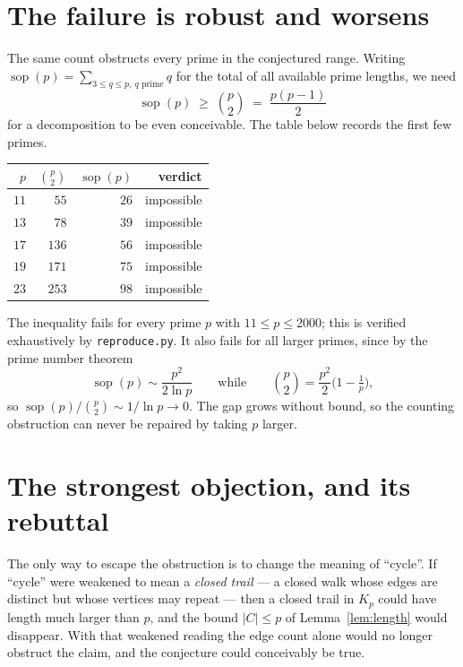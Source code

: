 \documentclass[11pt]{article}
\theoremstyle{definition}
\theoremstyle{remark}
\begin{document}
\section{The failure is robust and worsens}

The same count obstructs every prime in the conjectured range. Writing
$\operatorname{sop}(p) = \sum_{3 \le q \le p,\ q \text{ prime}} q$ for the total
of all available prime lengths, we need
\[
\operatorname{sop}(p) \;\ge\; \binom{p}{2} \;=\; \frac{p(p-1)}{2}
\]
for a decomposition to be even conceivable. The table below records the first
few primes.

\begin{center}
\begin{tabular}{r|r|r|r}
$p$ & $\binom{p}{2}$ & $\operatorname{sop}(p)$ & verdict \\ \hline
$11$ & $55$  & $26$  & impossible \\
$13$ & $78$  & $39$  & impossible \\
$17$ & $136$ & $56$  & impossible \\
$19$ & $171$ & $75$  & impossible \\
$23$ & $253$ & $98$  & impossible \\
\end{tabular}
\end{center}

The inequality fails for every prime $p$ with $11 \le p \le 2000$; this is
verified exhaustively by \texttt{reproduce.py}. It also fails for all larger
primes, since by the prime number theorem
\[
\operatorname{sop}(p) \sim \frac{p^2}{2 \ln p}
\qquad\text{while}\qquad
\binom{p}{2} = \frac{p^2}{2}\bigl(1 - \tfrac1p\bigr),
\]
so $\operatorname{sop}(p) / \binom{p}{2} \sim 1/\ln p \to 0$. The gap grows
without bound, so the counting obstruction can never be repaired by taking
$p$ larger.

\section{The strongest objection, and its rebuttal}

The only way to escape the obstruction is to change the meaning of ``cycle''.
If ``cycle'' were weakened to mean a \emph{closed trail} --- a closed walk whose
edges are distinct but whose vertices may repeat --- then a closed trail in
$K_p$ could have length much larger than $p$, and the bound
$\lvert C \rvert \le p$ of Lemma~\ref{lem:length} would disappear. With that
weakened reading the edge count alone would no longer obstruct the claim, and
the conjecture could conceivably be true.
\end{document}
